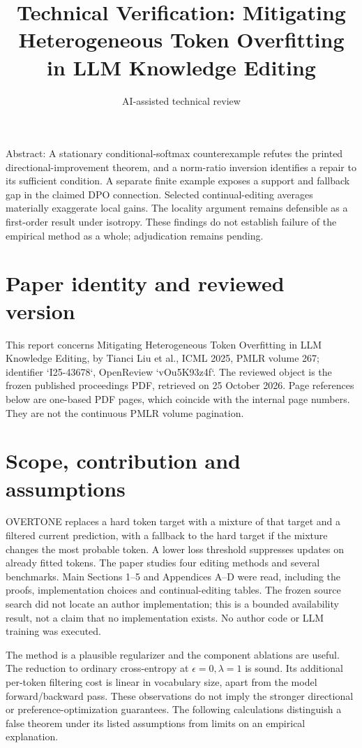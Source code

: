 \documentclass[10pt]{article}
\title{Technical Verification: Mitigating Heterogeneous Token Overfitting in LLM Knowledge Editing}
\author{AI-assisted technical review}
\date{}
\begin{document}
\maketitle
Abstract: A stationary conditional-softmax counterexample refutes the printed directional-improvement theorem, and a norm-ratio inversion identifies a repair to its sufficient condition. A separate finite example exposes a support and fallback gap in the claimed DPO connection. Selected continual-editing averages materially exaggerate local gains. The locality argument remains defensible as a first-order result under isotropy. These findings do not establish failure of the empirical method as a whole; adjudication remains pending.\par
\section*{Paper identity and reviewed version}
This report concerns Mitigating Heterogeneous Token Overfitting in LLM Knowledge Editing, by Tianci Liu et al., ICML 2025, PMLR volume 267; identifier `I25-43678`, OpenReview `vOu5K93z4f`. The reviewed object is the frozen published proceedings PDF, retrieved on 25 October 2026. Page references below are one-based PDF pages, which coincide with the internal page numbers. They are not the continuous PMLR volume pagination.\par
\section*{Scope, contribution and assumptions}
OVERTONE replaces a hard token target with a mixture of that target and a filtered current prediction, with a fallback to the hard target if the mixture changes the most probable token. A lower loss threshold suppresses updates on already fitted tokens. The paper studies four editing methods and several benchmarks. Main Sections 1–5 and Appendices A–D were read, including the proofs, implementation choices and continual-editing tables. The frozen source search did not locate an author implementation; this is a bounded availability result, not a claim that no implementation exists. No author code or LLM training was executed.\par
The method is a plausible regularizer and the component ablations are useful. The reduction to ordinary cross-entropy at \(\epsilon=0,\lambda=1\) is sound. Its additional per-token filtering cost is linear in vocabulary size, apart from the model forward/backward pass. These observations do not imply the stronger directional or preference-optimization guarantees. The following calculations distinguish a false theorem under its listed assumptions from limits on an empirical explanation.\par
\end{document}
